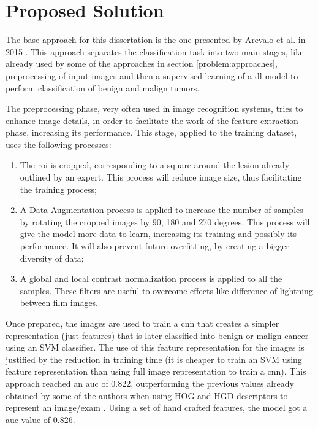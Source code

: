 \documentclass[
  twoside,
  11pt, a4paper,
  footinclude=true,
  headinclude=true,
  cleardoublepage=empty
]{scrbook}
\begin{document}
    \section{Proposed Solution} \label{problem:proposal}
      The base approach for this dissertation is the one presented by Arevalo et al. in 2015 \cite{arevalo2016representation}. This approach separates the classification task into two main stages, like already used by some of the approaches in section \ref{problem:approaches}, preprocessing of input images and then a supervised learning of a \gls{dl} model to perform classification of benign and malign tumors.

      The preprocessing phase, very often used in image recognition systems, tries to enhance image details, in order to facilitate the work of the feature extraction phase, increasing its performance. This stage, applied to the training dataset, uses the following processes:

      \begin{enumerate}
        \item The \gls{roi} is cropped, corresponding to a square around the lesion already outlined by an expert. This process will reduce image size, thus facilitating the training process;
        \item A Data Augmentation process is applied to increase the number of samples by rotating the cropped images by 90, 180 and 270 degrees. This process will give the model more data to learn, increasing its training and possibly its performance. It will also prevent future overfitting, by creating a bigger diversity of data;
        \item A global and local contrast normalization process is applied to all the samples. These filters are useful to overcome effects like difference of lightning between film images.
      \end{enumerate}

      Once prepared, the images are used to train a \gls{cnn} that creates a simpler representation (just features) that is later classified into benign or malign cancer using an SVM classifier. The use of this feature representation for the images is justified by the reduction in training time (it is cheaper to train an SVM using feature representation than using full image representation to train a \gls{cnn}). This approach reached an \gls{auc} of 0.822, outperforming the previous values already obtained by some of the authors when using HOG and HGD descriptors to represent an image/exam \cite{moura2013evaluation}. Using a set of hand crafted features, the model got a \gls{auc} value of 0.826.
\end{document}
